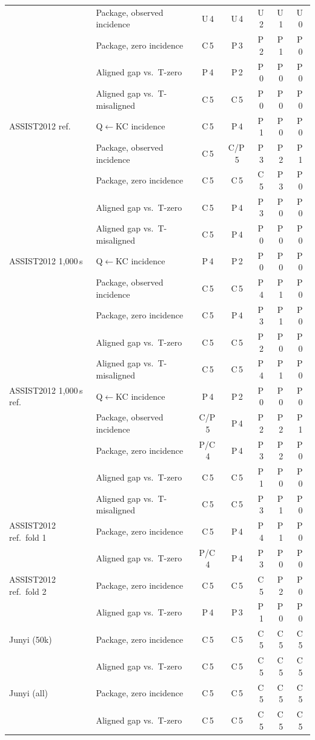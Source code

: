 \begin{table}[H]
\begin{tabular}{@{}llccccc@{}}
 & Package, observed incidence & U\,4 & U\,4 & U\,2 & U\,1 & U\,0 \\
 & Package, zero incidence & C\,5 & P\,3 & P\,2 & P\,1 & P\,0 \\
 & Aligned gap vs.\ T-zero & P\,4 & P\,2 & P\,0 & P\,0 & P\,0 \\
 & Aligned gap vs.\ T-misaligned & C\,5 & C\,5 & P\,0 & P\,0 & P\,0 \\
\addlinespace
ASSIST2012 ref. & Q$\leftarrow$KC incidence & C\,5 & P\,4 & P\,1 & P\,0 & P\,0 \\
 & Package, observed incidence & C\,5 & C/P\,5 & P\,3 & P\,2 & P\,1 \\
 & Package, zero incidence & C\,5 & C\,5 & C\,5 & P\,3 & P\,0 \\
 & Aligned gap vs.\ T-zero & C\,5 & P\,4 & P\,3 & P\,0 & P\,0 \\
 & Aligned gap vs.\ T-misaligned & C\,5 & P\,4 & P\,0 & P\,0 & P\,0 \\
\addlinespace
ASSIST2012 1{,}000\,s & Q$\leftarrow$KC incidence & P\,4 & P\,2 & P\,0 & P\,0 & P\,0 \\
 & Package, observed incidence & C\,5 & C\,5 & P\,4 & P\,1 & P\,0 \\
 & Package, zero incidence & C\,5 & P\,4 & P\,3 & P\,1 & P\,0 \\
 & Aligned gap vs.\ T-zero & C\,5 & C\,5 & P\,2 & P\,0 & P\,0 \\
 & Aligned gap vs.\ T-misaligned & C\,5 & C\,5 & P\,4 & P\,1 & P\,0 \\
\addlinespace
ASSIST2012 1{,}000\,s ref. & Q$\leftarrow$KC incidence & P\,4 & P\,2 & P\,0 & P\,0 & P\,0 \\
 & Package, observed incidence & C/P\,5 & P\,4 & P\,2 & P\,2 & P\,1 \\
 & Package, zero incidence & P/C\,4 & P\,4 & P\,3 & P\,2 & P\,0 \\
 & Aligned gap vs.\ T-zero & C\,5 & C\,5 & P\,1 & P\,0 & P\,0 \\
 & Aligned gap vs.\ T-misaligned & C\,5 & C\,5 & P\,3 & P\,1 & P\,0 \\
\addlinespace
ASSIST2012 ref.\ fold 1 & Package, zero incidence & C\,5 & P\,4 & P\,4 & P\,1 & P\,0 \\
 & Aligned gap vs.\ T-zero & P/C\,4 & P\,4 & P\,3 & P\,0 & P\,0 \\
\addlinespace
ASSIST2012 ref.\ fold 2 & Package, zero incidence & C\,5 & C\,5 & C\,5 & P\,2 & P\,0 \\
 & Aligned gap vs.\ T-zero & P\,4 & P\,3 & P\,1 & P\,0 & P\,0 \\
\addlinespace
Junyi (50k) & Package, zero incidence & C\,5 & C\,5 & C\,5 & C\,5 & C\,5 \\
 & Aligned gap vs.\ T-zero & C\,5 & C\,5 & C\,5 & C\,5 & C\,5 \\
\addlinespace
Junyi (all) & Package, zero incidence & C\,5 & C\,5 & C\,5 & C\,5 & C\,5 \\
 & Aligned gap vs.\ T-zero & C\,5 & C\,5 & C\,5 & C\,5 & C\,5 \\
\bottomrule
\end{tabular}
\end{table}

